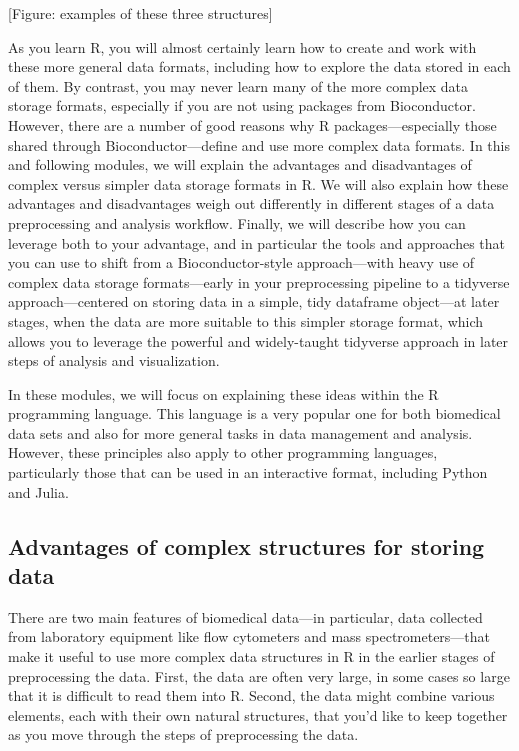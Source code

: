 \documentclass[]{tufte-book}
\begin{document}
{[}Figure: examples of these three structures{]}

As you learn R, you will almost certainly learn how to create and work with
these more general data formats, including how to explore the data stored in
each of them. By contrast, you may never learn many of the more complex data
storage formats, especially if you are not using packages from Bioconductor.
However, there are a number of good reasons why R packages---especially those
shared through Bioconductor---define and use more complex data formats. In this
and following modules, we will explain the advantages and disadvantages of
complex versus simpler data storage formats in R. We will also explain how these
advantages and disadvantages weigh out differently in different stages of a data
preprocessing and analysis workflow. Finally, we will describe how you can
leverage both to your advantage, and in particular the tools and approaches that
you can use to shift from a Bioconductor-style approach---with heavy use of
complex data storage formats---early in your preprocessing pipeline to a
tidyverse approach---centered on storing data in a simple, tidy dataframe
object---at later stages, when the data are more suitable to this simpler
storage format, which allows you to leverage the powerful and widely-taught
tidyverse approach in later steps of analysis and visualization.

In these modules, we will focus on explaining these ideas within the R
programming language. This language is a very popular one for both biomedical
data sets and also for more general tasks in data management and analysis.
However, these principles also apply to other programming languages,
particularly those that can be used in an interactive format, including Python
and Julia.

\hypertarget{advantages-of-complex-structures-for-storing-data}{%
\subsection{Advantages of complex structures for storing data}\label{advantages-of-complex-structures-for-storing-data}}

There are two main features of biomedical data---in particular, data collected
from laboratory equipment like flow cytometers and mass spectrometers---that
make it useful to use more complex data structures in R in the earlier stages of
preprocessing the data. First, the data are often very large, in some cases so
large that it is difficult to read them into R. Second, the data might combine
various elements, each with their own natural structures, that you'd like to
keep together as you move through the steps of preprocessing the data.
\end{document}
